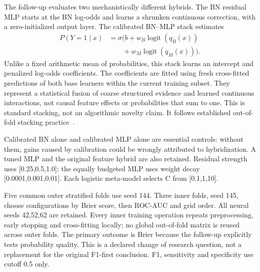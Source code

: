 \documentclass[conference]{IEEEtran}
\begin{document}
The follow-up evaluates two mechanistically different hybrids. The BN residual MLP starts at the BN log-odds and learns a shrunken continuous correction, with a zero-initialized output layer. The calibrated BN--MLP stack estimates
\begin{equation}
\begin{aligned}P(Y=1\mid x)&=\sigma\bigl(b+w_B\operatorname{logit}(q_B(x))\\&\qquad+w_M\operatorname{logit}(q_M(x))\bigr).\end{aligned}
\end{equation}
Unlike a fixed arithmetic mean of probabilities, this stack learns an intercept and penalized log-odds coefficients. The coefficients are fitted using fresh cross-fitted predictions of both base learners within the current training subset. They represent a statistical fusion of coarse structured evidence and learned continuous interactions, not causal feature effects or probabilities that sum to one. This is standard stacking, not an algorithmic novelty claim. It follows established out-of-fold stacking practice~\cite{stacking}.

Calibrated BN alone and calibrated MLP alone are essential controls: without them, gains caused by calibration could be wrongly attributed to hybridization. A tuned MLP and the original feature hybrid are also retained. Residual strength uses [0.25,0.5,1.0]; the equally budgeted MLP uses weight decay [0.0001,0.001,0.01]. Each logistic meta-model selects C from [0.1,1,10].

Five common outer stratified folds use seed 144. Three inner folds, seed 145, choose configurations by Brier score, then ROC-AUC and grid order. All neural seeds 42,52,62 are retained. Every inner training operation repeats preprocessing, early stopping and cross-fitting locally; no global out-of-fold matrix is reused across outer folds. The primary outcome is Brier because the follow-up explicitly tests probability quality. This is a declared change of research question, not a replacement for the original F1-first conclusion. F1, sensitivity and specificity use cutoff 0.5 only.
\end{document}
